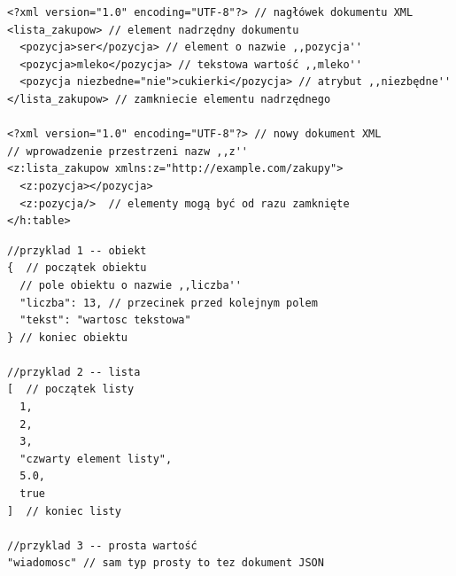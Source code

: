 \begin{lstlisting}[float, frame=single, caption={Przykłady XML. Komentarze poprzedzone przez ,,//'', mimo, że składnia komentarzy w~XML jest inna.}, label=kod:xml-example]
<?xml version="1.0" encoding="UTF-8"?> // nagłówek dokumentu XML
<lista_zakupow> // element nadrzędny dokumentu
  <pozycja>ser</pozycja> // element o nazwie ,,pozycja''
  <pozycja>mleko</pozycja> // tekstowa wartość ,,mleko''
  <pozycja niezbedne="nie">cukierki</pozycja> // atrybut ,,niezbędne''
</lista_zakupow> // zamkniecie elementu nadrzędnego

<?xml version="1.0" encoding="UTF-8"?> // nowy dokument XML
// wprowadzenie przestrzeni nazw ,,z''
<z:lista_zakupow xmlns:z="http://example.com/zakupy">
  <z:pozycja></pozycja>
  <z:pozycja/>  // elementy mogą być od razu zamknięte
</h:table>
\end{lstlisting}

\begin{lstlisting}[float, frame=single, caption={Przykłady JSON. Komentarze poprzedzone przez ,,//'', mimo, że składnia JSON nie posiada komentarzy.}, label=kod:json-example]
//przyklad 1 -- obiekt
{  // początek obiektu
  // pole obiektu o nazwie ,,liczba''
  "liczba": 13, // przecinek przed kolejnym polem
  "tekst": "wartosc tekstowa"
} // koniec obiektu

//przyklad 2 -- lista
[  // początek listy
  1,
  2,
  3,
  "czwarty element listy",
  5.0,
  true
]  // koniec listy

//przyklad 3 -- prosta wartość
"wiadomosc" // sam typ prosty to tez dokument JSON
\end{lstlisting}

%
%

%


